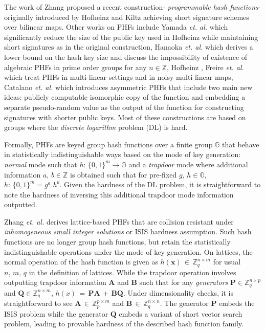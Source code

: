 \documentclass[10pt]{elsarticle}
\begin{document}
The work of Zhang \cite{CRHF_Zhang2016} proposed a recent construction- \textit{programmable hash functions}- originally introduced by Hofheinz and Kiltz \cite{CRHF_Hofheinz2008} achieving short signature schemes over bilinear maps. Other works on PHFs include Yamada \textit{et. al.} \cite{CRHF_Yamada2012} which significantly reduce the size of the public key used in Hofheinz \cite{CRHF_Hofheinz2008} while maintaining short signatures as in the original construction, Hanaoka \textit{et. al.}\cite{CRHF_Hanaoka2012} which derives a lower bound on the hash key size and discuss the impossibility of existence of algebraic PHFs in prime order groups for any $n \in \mathbb{Z}$, Hofheinz \cite{CRHF_Hofheinz2012}, Freire \textit{et. al.} \cite{CRHF_Freire2013} which treat PHFs in multi-linear settings and in noisy multi-linear maps, Catalano \textit{et. al.} \cite{CRHF_Catalano2015} which introduces asymmetric PHFs that include two main new ideas: publicly computable isomorphic copy of the function and embedding a separate pseudo-random value as the output of the function for constructing signatures with shorter public keys. Most of these constructions are based on groups where the \textit{discrete logarithm} problem (DL) is hard.

Formally, PHFs are keyed group hash functions over a finite group $\mathbb{G}$ that behave in statistically indistinguishable ways based on the mode of key generation: \textit{normal} mode such that $h:\, \{0,1\}^{m} \rightarrow \mathbb{G}$ and a \textit{trapdoor} mode where additional information $a, \, b \in \mathbb{Z}$ is obtained such that for pre-fixed $g, \, h \in \mathbb{G}$, $h:\, \{0,1\}^{m} = g^{a}.h^{b}$. Given the hardness of the DL problem, it is straightforward to note the hardness of inversing this additional trapdoor mode information outputted.

Zhang \textit{et. al.} \cite{CRHF_Zhang2016} derives lattice-based PHFs that are collision resistant under \textit{inhomogeneous small integer solutions} or ISIS hardness assumption. Such hash functions are no longer group hash functions, but retain the statistically indistinguishable operations under the mode of key generation. On lattices, the normal operation of the hash function is given as $h(\mathbf{x}) \, \in \, \mathbb{Z}^{n \times m}_{q}$ for usual $n,\, m,\, q$ in the definition of lattices. While the trapdoor operation involves outputting trapdoor information $\mathbf{A}$ and $\mathbf{B}$ such that for any \textit{generators} $\mathbf{P} \in \mathbb{Z}^{n \times p}_{q}$ and $\mathbf{Q} \in \mathbb{Z}^{n \times m}_{q}$, $h(x)\,=\,\mathbf{P} \mathbf{A} \,+\, \mathbf{B} \mathbf{Q}$. Under dimensionality checks, it is straightforward to see $\mathbf{A}\,\in\,\mathbb{Z}_{p}^{p \times m}$ and $\mathbf{B}\,\in\,\mathbb{Z}^{n \times n}_{q}$. The generator $\mathbf{P}$ embeds the ISIS problem while the generator $\mathbf{Q}$ embeds a variant of short vector search problem, leading to provable hardness of the described hash function family.
\end{document}
